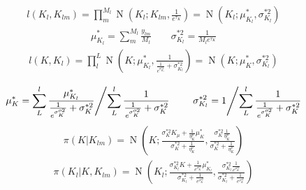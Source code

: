 \documentclass[11pt,a4paper]{article}
\begin{document}
\begin{align*}
l(K_l,K_{lm})=\prod_{m}^{M_{l}}\operatorname{N}(K_l;K_{lm},\frac{1}{e^{\tau_{K}}})=
\operatorname{N}(K_l;\mu^{*}_{K_l},{\sigma^{*2}_{K_l}})
\end{align*}
\begin{align*}
\mu^{*}_{K_l}=\sum_{m}^{M_{l}} \frac{y_{lm} }{ M_l}
\qquad 
{\sigma^{*2}_{K_l}}=\frac{1 }{ M_{l}e^{\tau_{K}} }
\end{align*}
\begin{align*}
l(K,K_{l})=\prod_{l}^{L}\operatorname{N}(K;\mu^{*}_{K_l},\frac{1}{\frac{1}{e^{\sigma^{*2}_{K_l}}}+{\sigma^{*2}_{K_l}}})=
\operatorname{N}(K;\mu^{*}_{K},{\sigma^{*2}_{K_l}})
\end{align*}

\begin{align*}
\left.\mu^{*}_{K}=\sum_{L}^{l}\frac{\mu^{*}_{K_l}}{\frac{1}{e^{{\sigma^{o2}_{K}}}}+{\sigma^{*2}_{K}}} \middle/ \sum_{L}^{l}\frac{1}{\frac{1}{e^{{\sigma^{o2}_{K}}}}+{\sigma^{*2}_{K}}}  \right.
\qquad 
\left.{\sigma^{*2}_{K_{l}}}=1\middle/
\sum_{L}^{l}\frac{1}{\frac{1}{e^{{\sigma^{o2}_{K}}}}+{\sigma^{*2}_{K}}}\right.
\end{align*}
\begin{align*}
\pi(K|K_{lm})=\operatorname{N}(K;\frac{{\sigma^{*2}_{K}} K_{\mu}+\frac{1}{\eta^{p}_{K}}\mu^{*}_K}{{\sigma^{*2}_{K}}+\frac{1}{\eta^{p}_{K}}},\frac{{\sigma^{*2}_{K}} \frac{1}{\eta^{p}_{K}}}{{\sigma^{*2}_{K}}+\frac{1}{\eta^{p}_{K}}} )
\end{align*}
\begin{align*}
\pi(K_{l}|K,K_{lm})=\operatorname{N}(K_l;
\frac{
	{\sigma^{*2}_{K_{l}}} K + \frac{1}{ e^{ {\sigma^{o2}_{K}} } } \mu^{*}_{K_{l}}
	}{
	{\sigma^{*2}_{K_{l}}} + \frac{1}{ e^{ {\sigma^{o2}_{K}} } }
	}
,\frac{
	{\sigma^{*2}_{K_{l}}} \frac{1}{e^{{\sigma^{o2}_{K}}}}
	}{
	{\sigma^{*2}_{K_{l}}}+\frac{1}{e^{{\sigma^{o2}_{K}}}}} )
\end{align*}
\end{document}
